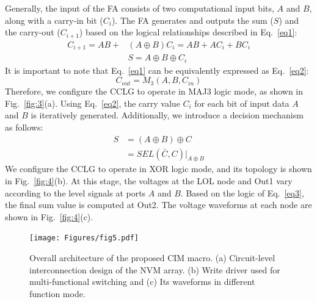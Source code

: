 \documentclass[submit]{elex2024}%
\begin{document}
\noindent
Generally, the input of the FA consists of two computational input bits, $A$ and $B$, along with a carry-in bit ($C_i$). The FA generates and outputs the sum ($S$) and the carry-out ($C_{i+1}$) based on the logical relationships described in Eq.~\ref{eq1}: 
\begin{equation}
    \begin{aligned}
        C_{i+1} = AB + &\left( A \oplus B \right) C_i = AB + AC_i + BC_i \\
        &S = A \oplus B \oplus C_i
        \label{eq1}
    \end{aligned}
\end{equation}
It is important to note that Eq.~\ref{eq1} can be equivalently expressed as Eq.~\ref{eq2}:
\begin{equation}
    C_{out} = M_3\left(A,B,C_{in}\right)
    \label{eq2}
\end{equation}%
Therefore, we configure the CCLG to operate in MAJ3 logic mode, as shown in Fig.~\ref{fig:3}(a). Using Eq.~\ref{eq2}, the carry value $C_i$ for each bit of input data $A$ and $B$ is iteratively generated. Additionally, we introduce a decision mechanism as follows: 
\begin{equation}
\begin{aligned}
    S &=    (A\oplus B)\oplus C\\
      &=    SEL(\bar{C},C)|_{A\oplus B}
    \label{eq3}
\end{aligned}
\end{equation}%
We configure the CCLG to operate in XOR logic mode, and its topology is shown in Fig.~\ref{fig:4}(b). At this stage, the voltages at the LOL node and Out1 vary according to the level signals at ports $A$ and $B$. Based on the logic of Eq.~\ref{eq3}, the final sum value is computed at Out2. The voltage waveforms at each node are shown in Fig.~\ref{fig:4}(c). 

\begin{figure}[htb]
    \begin{center}
    \texttt{[image: Figures/fig5.pdf]}
    \end{center}
    \caption{Overall architecture of the proposed CIM macro. (a) Circuit-level interconnection design of the NVM array. (b) Write driver used for multi-functional switching and (c) Its waveforms in different function mode.}
    \label{fig:5}
\end{figure}
\end{document}
